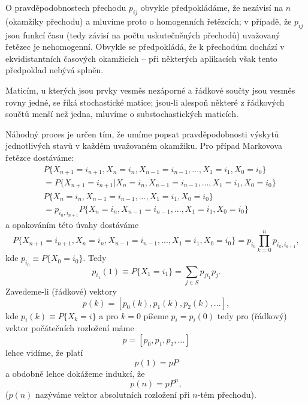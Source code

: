 \documentclass[10pt]{article}
\begin{document}
O pravděpodobnostech přechodu $p_{ij}$ obvykle předpokládáme, že nezávisí na $n$ (okamžiky přechodu) a mluvíme proto o homogenních řetězcích; v případě, že $p_{ij}$ jsou funkcí času (tedy závisí na počtu uskutečněných přechodů) uvažovaný řetězec je nehomogenní. Obvykle se předpokládá, že k přechodům dochází v ekvidistantních časových okamžicích -- při některých aplikacích však tento předpoklad nebývá splněn.

Maticím, u kterých jsou prvky vesměs nezáporné a řádkové součty jsou vesměs rovny jedné, se říká stochastické matice; jsou-li alespoň některé z řádkových součtů menší než jedna, mluvíme o substochastických maticích.

Náhodný proces je určen tím, že umíme popsat pravděpodobnosti výskytů jednotlivých stavů v každém uvažovaném okamžiku. Pro případ Markovova řetězce dostáváme:
\begin{equation}
\begin{split}
&P\{X_{n+1}=i_{n+1},X_{n}=i_{n},X_{n-1}=i_{n-1},...,X_{1}=i_{1},X_{0}=i_{0}\}\\
&=P\{X_{n+1}=i_{n+1}|X_{n}=i_{n},X_{n-1}=i_{n-1},...,X_{1}=i_{1},X_{0}=i_{0}\}\\
&P\{X_{n}=i_{n},X_{n-1}=i_{n-1},...,X_{1}=i_{1},X_{0}=i_{0}\}\\
&=p_{i_n,i_{n+1}}P\{X_{n}=i_{n},X_{n-1}=i_{n-1},...,X_{1}=i_{1},X_{0}=i_{0}\}
\end{split}
\end{equation}
a opakováním této úvahy dostáváme
\begin{equation}
P\{X_{n+1}=i_{n+1},X_{n}=i_{n},X_{n-1}=i_{n-1},...,X_{1}=i_{1},X_{0}=i_{0}\}=p_{i_0}\prod_{k=0}^{n} p_{i_{k},i_{k+1}},
\end{equation}
kde $p_{i_0} \equiv P\{X_0=i_0\}$. Tedy 
\begin{equation}
p_{i_1}(1) \equiv P\{X_1=i_1\} = \sum_{j \in S} p_{ji_1}p_j.
\end{equation}
Zavedeme-li (řádkové) vektory
\begin{equation}
p(k) = [p_0(k),p_1(k),p_2(k),...],
\end{equation}
kde $p_i(k) \equiv P\{X_k=i\}$ a pro $k=0$ píšeme $p_i=p_i(0)$ tedy pro (řádkový) vektor počátečních rozložení máme $$p=[p_0,p_1,p_2,...]$$ lehce vidíme, že platí $$p(1) = pP$$ a obdobně lehce dokážeme indukcí, že \begin{equation}
p(n)=pP^n,
\end{equation} ($p(n)$ nazýváme vektor absolutních rozložení při $n$-tém přechodu).
\end{document}

